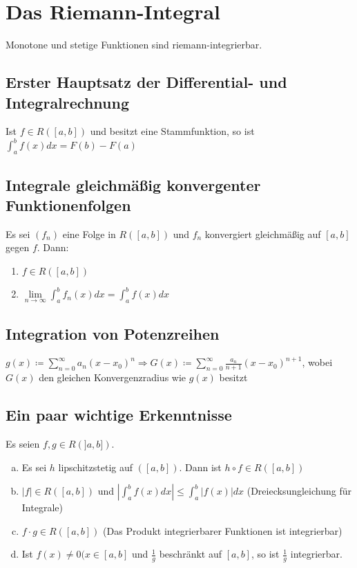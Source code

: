 \documentclass{article}
\begin{document}
\section{Das Riemann-Integral}
Monotone und stetige Funktionen sind riemann-integrierbar.

\subsection{Erster Hauptsatz der Differential- und Integralrechnung}
Ist $f \in R([a,b])$ und besitzt eine Stammfunktion, so ist $\int_a^b f(x)dx = F(b) - F(a)$

\subsection{Integrale gleichmäßig konvergenter Funktionenfolgen}
Es sei $(f_n)$ eine Folge in $R([a,b])$ und $f_n$ konvergiert gleichmäßig auf $[a,b]$ gegen $f$. Dann:
\begin{enumerate}
    \item $f \in R([a,b])$
    \item $\lim \limits_{n \to \infty} \int_a^b f_n(x) dx = \int_a^b f(x) dx$
\end{enumerate}

\subsection{Integration von Potenzreihen}
$g(x) \coloneqq \sum \limits_{n=0}^{\infty} a_n (x-x_0)^n \Rightarrow G(x) \coloneqq \sum \limits_{n=0}^{\infty} \frac{a_n}{n+1} (x-x_0)^{n+1}$, 
wobei $G(x)$ den gleichen Konvergenzradius wie $g(x)$ besitzt

\subsection{Ein paar wichtige Erkenntnisse}
Es seien $f,g \in R(]a,b])$.
\begin{enumerate} [a)]
    \item Es sei $h$ lipschitzstetig auf $([a,b])$. Dann ist $h \circ f \in R([a,b])$
    \item $|f| \in R([a,b])$ und $|\int_a^b f(x) dx| \leq \int_a^b|f(x)| dx$ (Dreiecksungleichung für Integrale)
    \item $f \cdot g \in R([a,b])$ (Das Produkt integrierbarer Funktionen ist integrierbar)
    \item Ist $f(x) \neq 0 (x \in [a,b]$ und $\frac{1}{g}$ beschränkt auf $[a,b]$, so ist $\frac{1}{g}$ integrierbar.
\end{enumerate}
\end{document}
